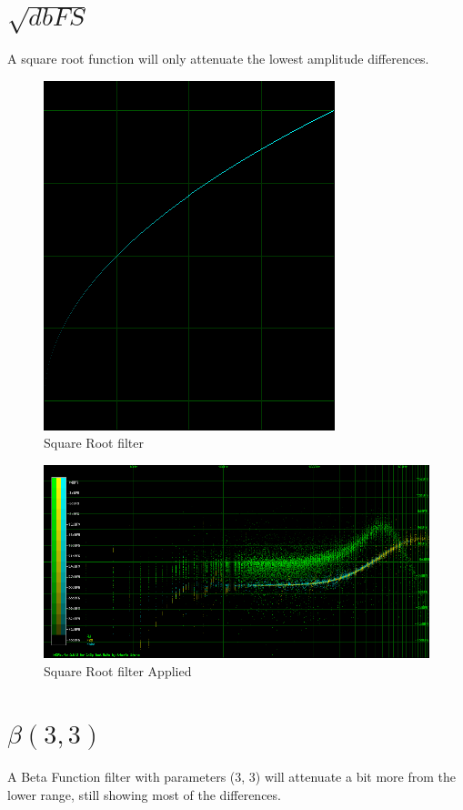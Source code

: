 \documentclass[10pt,a4paper]{report}
\begin{document}
\begin{appendices}
\newpage
\section{$\sqrt{dbFS}$} 

A square root function will only attenuate the lowest amplitude differences.

\begin{figure}[H]
	\centering
	\includegraphics[width=0.4\linewidth]{plots/BetaFunctionPlot_1.png}
	\caption[Square Root filter]{Square Root filter}
	\label{fig:betafunctionplot1}
\end{figure}

\begin{figure}[H]
	\centering
	\includegraphics[width=1\linewidth]{plots/BetaFunctionPlot_1_Data.png}
	\caption[Square Root filter]{Square Root filter Applied}
	\label{fig:betafunctionplot1data}
\end{figure}

\newpage
\section{$\beta(3,3)$}

A Beta Function filter with parameters (3, 3) will attenuate a bit more from the lower range, still showing most of the differences.


\end{appendices}
\end{document}
